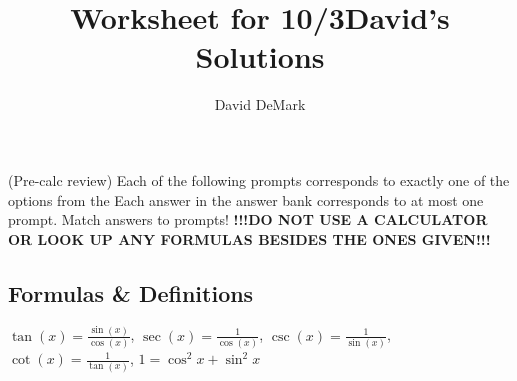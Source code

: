 \documentclass[english]{article}
\title{Worksheet for 10/3\textemdash David's Solutions}
\author{David DeMark}
\date{\due}
\newcommand{\prob}[1]{\setcounter{section}{#1-1}\section{}}
\theoremstyle{remark}
\theoremstyle{definition}
\begin{document}

		\prob{1}{(Pre-calc review) Each of the following prompts corresponds to exactly one of the options from the  Each answer in the answer bank corresponds to at most one prompt. Match answers to prompts! \textbf{!!!DO NOT USE A CALCULATOR OR LOOK UP ANY FORMULAS BESIDES THE ONES GIVEN!!!}}\newline
		\subsection*{Formulas \& Definitions}
		
		$\tan(x)=\frac{\sin(x)}{\cos(x)}$,
		$	\sec(x)=\frac{1}{\cos(x)}$,
		$	\csc(x)=\frac{1}{\sin(x)}$,
		$	\cot(x)=\frac{1}{\tan(x)}$,
$1=\cos^2x+\sin^2x$
\end{document}
